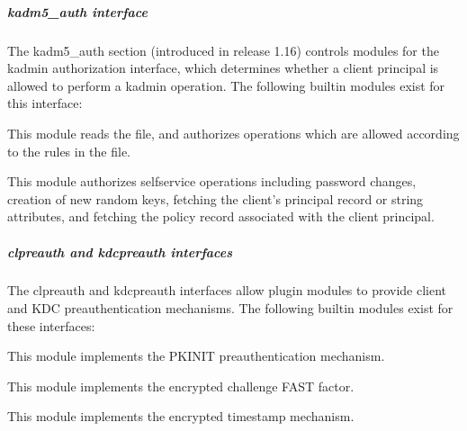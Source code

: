 \documentclass[letterpaper,10pt,english]{sphinxmanual}
\begin{document}
\subparagraph{kadm5\_auth interface}
\label{\detokenize{admin/conf_files/krb5_conf:kadm5-auth-interface}}\label{\detokenize{admin/conf_files/krb5_conf:kadm5-auth}}
\sphinxAtStartPar
The kadm5\_auth section (introduced in release 1.16) controls modules
for the kadmin authorization interface, which determines whether a
client principal is allowed to perform a kadmin operation.  The
following built\sphinxhyphen{}in modules exist for this interface:
\begin{description}
\sphinxAtStartPar
This module reads the {\hyperref[\detokenize{admin/conf_files/kadm5_acl:kadm5-acl-5}]{}} file, and authorizes
operations which are allowed according to the rules in the file.

\sphinxAtStartPar
This module authorizes self\sphinxhyphen{}service operations including password
changes, creation of new random keys, fetching the client’s
principal record or string attributes, and fetching the policy
record associated with the client principal.

\end{description}


\subparagraph{clpreauth and kdcpreauth interfaces}
\label{\detokenize{admin/conf_files/krb5_conf:clpreauth-and-kdcpreauth-interfaces}}\label{\detokenize{admin/conf_files/krb5_conf:kdcpreauth}}\label{\detokenize{admin/conf_files/krb5_conf:clpreauth}}
\sphinxAtStartPar
The clpreauth and kdcpreauth interfaces allow plugin modules to
provide client and KDC preauthentication mechanisms.  The following
built\sphinxhyphen{}in modules exist for these interfaces:
\begin{description}
\sphinxAtStartPar
This module implements the PKINIT preauthentication mechanism.

\sphinxAtStartPar
This module implements the encrypted challenge FAST factor.

\sphinxAtStartPar
This module implements the encrypted timestamp mechanism.

\end{description}
\end{document}
